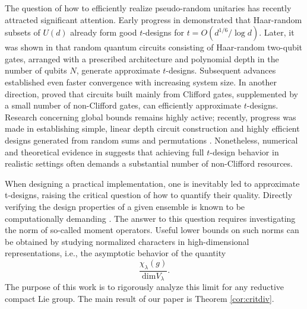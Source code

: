 \documentclass[11pt, a4paper]{article}
\theoremstyle{definition}
\theoremstyle{remark}
\begin{document}
The question of how to efficiently realize pseudo-random unitaries has recently attracted significant attention. Early progress in \cite{HArrowHasstings2008,HH09} demonstrated that Haar-random subsets of $U(d)$ already form good $t$-designs for $t = O(d^{1/6}/\log d)$. Later, it was shown in \cite{BHH2016} that random quantum circuits consisting of Haar-random two-qubit gates, arranged with a prescribed architecture and polynomial depth in the number of qubits $N$, generate approximate $t$-designs. Subsequent advances \cite{Harrow2018,Haferkamp2022randomquantum,PhysRevA.104.022417,Yoshifumi1} established even faster convergence with increasing system size. In another direction, \cite{Qhomeopathy2020} proved that circuits built mainly from Clifford gates, supplemented by a small number of non-Clifford gates, can efficiently approximate $t$-designs. Research concerning global bounds remains highly active; recently, progress was made in establishing simple, linear depth circuit construction \cite{Metger2024} and highly efficient designs generated from random sums and permutations \cite{Chen2024}. Nonetheless, numerical and theoretical evidence in \cite{OLIVIERO2021127721,Leone2021quantumchaosis} suggests that achieving full $t$-design behavior in realistic settings often demands a substantial number of non-Clifford resources.



When designing a practical implementation, one is inevitably led to approximate t-designs, raising the critical question of how to quantify their quality. Directly verifying the design properties of a given ensemble is known to be computationally demanding \cite{Nakata2025}. The answer to this question requires investigating the norm of so-called moment operators. Useful lower bounds on such norms can be obtained by studying normalized characters in high-dimensional representations, i.e., the asymptotic behavior of the quantity 
\begin{equation}
    \frac{\chi_\lambda(g)}{\mathrm{dim}V_\lambda}.
\end{equation}
The purpose of this work is to rigorously analyze this limit for any reductive compact Lie group. The main result of our paper is Theorem \ref{cor:critdiv}.
\end{document}
